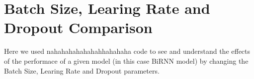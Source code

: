 \section{Batch Size, Learing Rate and Dropout Comparison}

Here we used nahahahahahahahhahahaha code to see and understand the effects of the performace of a given model (in this case BiRNN model) by changing the Batch Size, Learing Rate and Dropout parameters.




